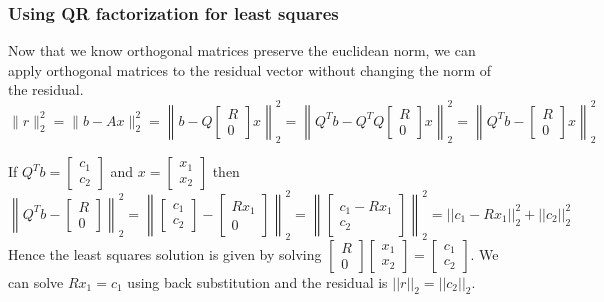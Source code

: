 \documentclass[10pt]{beamer}
\begin{document}
\begin{frame}
\frametitle{Using QR factorization for least squares}
Now that we know orthogonal matrices preserve the euclidean norm, we can apply orthogonal matrices to the residual vector without changing the norm of the residual. 
$$\|r\|^2_2 = \|b-Ax\|^2_2 = \left\|b-Q \begin{bmatrix} R \\ 0 \end{bmatrix}x\right\|^2_2 = \left\|Q^Tb - Q^TQ\begin{bmatrix}R \\ 0 \end{bmatrix}x \right\|^2_2 = \left\|Q^Tb - \begin{bmatrix} R \\ 0 \end{bmatrix}x \right\|^2_2$$

\bigskip

If $Q^Tb = \begin{bmatrix} c_1 \\ c_2 \end{bmatrix}$ and $x = \begin{bmatrix} x_1 \\ x_2\end{bmatrix}$ then 
$$\left\|Q^Tb-\begin{bmatrix}R\\0\end{bmatrix}\right\|^2_2 = \left\|\begin{bmatrix}c_1\\c_2\end{bmatrix} - \begin{bmatrix} Rx_1\\0\end{bmatrix}\right\|^2_2 = \left\|\begin{bmatrix} c_1-Rx_1 \\ c_2 \end{bmatrix}\right\|^2_2 = ||c_1 - Rx_1||^2_2 + ||c_2||^2_2$$ 
Hence the least squares solution is given by solving $\begin{bmatrix}R\\0\end{bmatrix}\begin{bmatrix}x_1 \\ x_2\end{bmatrix} = \begin{bmatrix}c_1 \\ c_2 \end{bmatrix}$.  We can solve $Rx_1 = c_1$ using back substitution and the residual is $||r||_2 = ||c_2||_2$.  
\end{frame}
\end{document}
